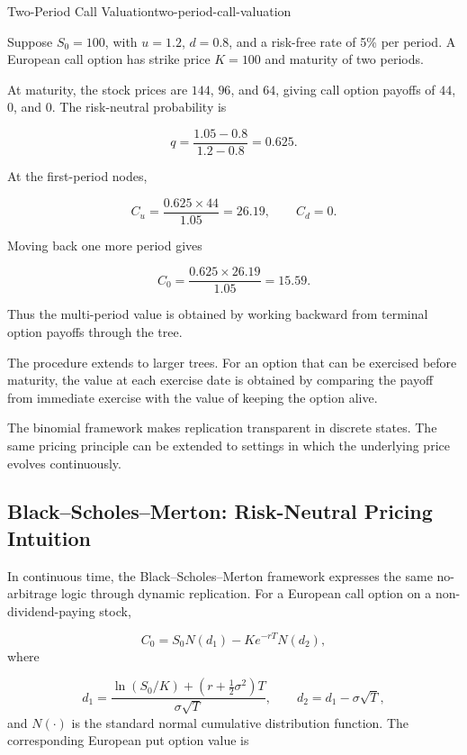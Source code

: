 \begin{example}{Two-Period Call Valuation}{two-period-call-valuation}

Suppose \(S_0=100\), with \(u=1.2\), \(d=0.8\), and a risk-free rate of 5\% per period. A European call option has strike price \(K=100\) and maturity of two periods.

At maturity, the stock prices are \(144\), \(96\), and \(64\), giving call option payoffs of \(44\), \(0\), and \(0\). The risk-neutral probability is

$$
q=\frac{1.05-0.8}{1.2-0.8}=0.625.
$$

At the first-period nodes,

$$
C_u=
\frac{0.625\times 44}{1.05}
=26.19,
\qquad
C_d=0.
$$

Moving back one more period gives

$$
C_0=
\frac{0.625\times 26.19}{1.05}
=15.59.
$$

Thus the multi-period value is obtained by working backward from terminal option payoffs through the tree.

\end{example}

The procedure extends to larger trees. For an option that can be exercised before maturity, the value at each exercise date is obtained by comparing the payoff from immediate exercise with the value of keeping the option alive.

The binomial framework makes replication transparent in discrete states. The same pricing principle can be extended to settings in which the underlying price evolves continuously.


\subsection[Black--Scholes--Merton: Risk-Neutral Pricing Intuition]{Black--Scholes--Merton: Risk-Neutral Pricing Intuition}

In continuous time, the Black--Scholes--Merton framework expresses the same no-arbitrage logic through dynamic replication. For a European call option on a non-dividend-paying stock,

\begin{equation}
C_0
=S_0N(d_1)-Ke^{-rT}N(d_2),
\label{eq:ch18-bsm-call}
\end{equation}
where

\begin{equation}
d_1
=\frac{\ln(S_0/K)+(r+\tfrac{1}{2}\sigma^2)T}{\sigma\sqrt{T}},
\qquad
d_2=d_1-\sigma\sqrt{T},
\label{eq:ch18-bsm-d1d2}
\end{equation}
and \(N(\cdot)\) is the standard normal cumulative distribution function. The corresponding European put option value is

